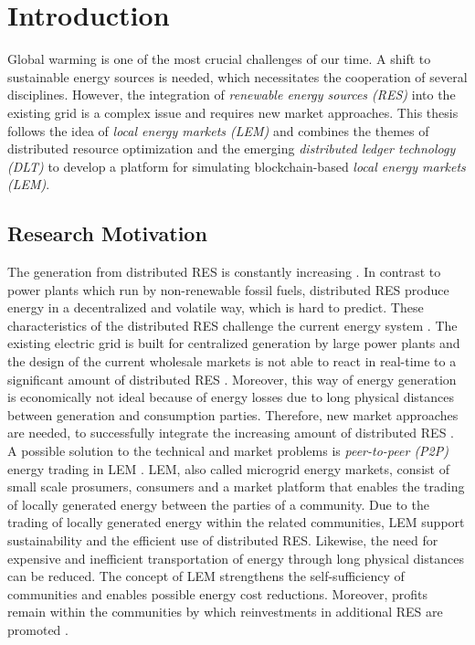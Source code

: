 \section{Introduction}
Global warming is one of the most crucial challenges of our time. A shift 
to sustainable energy sources is needed, which necessitates the cooperation of several disciplines. 
However, the integration of \textit{renewable energy sources (RES)} into the existing grid is 
a complex issue and requires new market approaches. 
This thesis follows the idea of \textit{local energy markets (LEM)} and combines the themes of 
distributed resource optimization and the emerging \textit{distributed ledger technology (DLT)} 
to develop a platform for simulating blockchain-based \textit{local energy markets (LEM)}.


\subsection{Research Motivation}
\label{sec:research_motivation}

The generation from distributed RES is constantly increasing . 
In contrast to power plants which run by non-renewable fossil fuels, distributed RES produce energy in a decentralized and volatile way, which is hard to predict. 
These characteristics of the distributed RES challenge the current energy system .
The existing electric grid is built for centralized generation by large power plants 
and the design of the current wholesale markets
is not able to react in real-time to a significant amount of distributed RES . 
Moreover, this way of energy generation is economically not ideal because of energy losses due to long physical
distances between generation and consumption parties. 
Therefore, new market approaches are needed, to successfully integrate the increasing amount of distributed RES . 
A possible solution to the technical and market problems is \textit{peer-to-peer (P2P)} energy trading in LEM . 
LEM, also called microgrid energy markets, consist of small scale prosumers, consumers and a market platform that enables the trading 
of locally generated energy between the parties of a community.
Due to the trading of locally generated energy within the related communities,
LEM support sustainability and the efficient use of distributed RES.
Likewise, the need for expensive and inefficient transportation of energy through long physical 
distances can be reduced. The concept of LEM strengthens the self-sufficiency of communities and 
enables possible energy cost reductions. Moreover, profits remain within the communities 
by which reinvestments in additional RES are promoted . 

